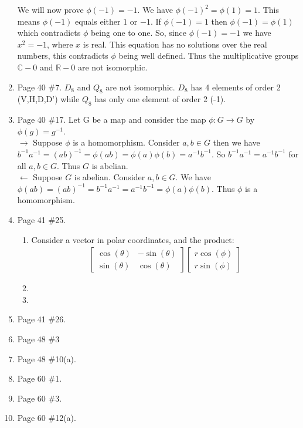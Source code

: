 \documentclass[12pt]{report}
\begin{document}
\begin{enumerate}
      We will now prove $\phi(-1) = -1$. We have $\phi(-1)^2 = \phi(1) = 1$.
      This means $\phi(-1)$ equals either $1$ or $-1$. If $\phi(-1) = 1$ then
      $\phi(-1) = \phi(1)$ which contradicts $\phi$ being one to one. So, since
      $\phi(-1) = -1$ we have $x^2 = -1$, where $x$ is real. This equation has
      no solutions over the real numbers, this contradicts $\phi$ being well
      defined. Thus the multiplicative groups $\mathbb{C} -{0}$ and
      $\mathbb{R} -{0}$ are not isomorphic.\\

\item Page 40 \#7. $D_8$ and $Q_8$ are not isomorphic. $D_8$ has 4 elements of
      order 2 (V,H,D,D') while $Q_8$ has only one element of order 2 (-1).\\

\item Page 40 \#17. Let G be a map and consider the map $\phi:G \to G$ by
      $\phi(g) = g^{-1}$.\\

      $\rightarrow$ Suppose $\phi$ is a homomorphism. Consider $a,b \in G$
      then we have $b^{-1}a^{-1} = (ab)^{-1} = \phi(ab) = \phi(a)\phi(b) =
      a^{-1}b^{-1}$. So $b^{-1}a^{-1} = a^{-1}b^{-1}$ for all $a,b \in G$. Thus
      $G$ is abelian.\\

      $\leftarrow$ Suppose $G$ is abelian. Consider $a,b \in G$. We have
      $\phi(ab) = (ab)^{-1} = b^{-1}a^{-1} = a^{-1}b^{-1} = \phi(a)\phi(b)$.
      Thus $\phi$ is a homomorphism.

\item Page 41 \#25.
  \begin{enumerate}
  \item Consider a vector in polar coordinates, and the product:
  \begin{align}
    \begin{bmatrix}
      \cos(\theta) & -\sin(\theta)\\
      \sin(\theta) & \cos(\theta)
    \end{bmatrix}
    \begin{bmatrix}
      r\cos(\phi)\\
      r\sin(\phi)
    \end{bmatrix}
  \end{align}
  \item
  \item
  \end{enumerate}

\item Page 41 \#26.

\item Page 48 \#3

\item Page 48 \#10(a).

\item Page 60 \#1.

\item Page 60 \#3.

\item Page 60 \#12(a).
\end{enumerate}
\end{document}

